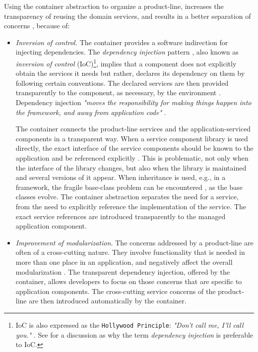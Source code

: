 Using the container abstraction to organize a product-line, increases the transparency of reusing the domain services, and results in a better separation of concerns \cite{parnas.72}, because of:
\begin{itemize}
\item \textit{Inversion of control.} The container provides a software indirection for injecting dependencies. The \textit{dependency injection} pattern \cite{fowler.ioc.04}, also known as \textit{inversion of control} (IoC)\footnote{IoC is also expressed as the \texttt{Hollywood Principle}: \textit{"Don't call me, I'll call you."} \cite{spring.article.03}. See \cite{fowler.ioc.04} for a discussion as why the term \textit{dependency injection} is preferable to IoC.}, implies that a component does not explicitly obtain the services it needs but rather, declares its dependency on them by following certain conventions. The declared services are then provided transparently to the component, as necessary, by the environment \cite{lorenz.96,ea.05}. Dependency injection \textit{"moves the responsibility for making things happen into the framework, and away from application code"} \cite{spring.article.03}.

The container connects the product-line services and the application-serviced components in a transparent way. When a service component library is used directly, the exact interface of the service components should be known to the application and be referenced explicitly . This is problematic, not only when the interface of the library changes, but also when the library is maintained and several versions of it appear. When inheritance is used, e.g., in a framework, the fragile base-class problem can be encountered \cite{Mezini.97,comp.soft.book,Nathanael.04}, as the base classes evolve. The container abstraction separates the need for a service, from the need to explicitly reference the implementation of the service. The exact service references are introduced transparently to the managed application component.

\item \textit{Improvement of modularization.} The concerns addressed by a product-line are often of a cross-cutting nature. They involve functionality that is needed in more than one place in an application, and negatively affect the overall modularization \cite{Crosscutting1.03,Crosscutting2.03}. The transparent dependency injection, offered by the container, allows developers to focus on those concerns that are specific to application components. The cross-cutting service concerns of the product-line are then introduced automatically by the container. %


\end{itemize}
